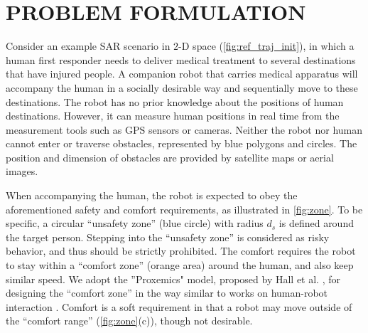 \documentclass[journal]{IEEEtran}
\begin{document}
\section{PROBLEM FORMULATION}\label{sec:formulation}
	Consider an example SAR scenario in $2$-D space (\cref{fig:ref_traj_init}), in which a human first responder needs to deliver medical treatment to several destinations that have injured people. 
	A companion robot that carries medical apparatus will accompany the human in a socially desirable way and sequentially move to these destinations.
	The robot has no prior knowledge about the positions of human destinations.
	However, it can measure human positions in real time from the measurement tools such as GPS sensors or cameras.
    Neither the robot nor human cannot enter or traverse obstacles, represented by blue polygons and circles. 
    The position and dimension of obstacles are provided by satellite maps or aerial images.
	
	When accompanying the human, the robot is expected to obey the aforementioned safety and comfort requirements, as illustrated in \cref{fig:zone}.
    To be specific, a circular ``unsafety zone'' (blue circle) with radius $d_s$ is defined around the target person.
	Stepping into the ``unsafety zone'' is considered as risky behavior, and thus should be strictly prohibited.	
	The comfort requires the robot to stay within a ``comfort zone'' (orange area) around the human, and also keep similar speed.
    We adopt the ''Proxemics" model, proposed by Hall et al. \cite{hall1968proxemics}, for designing the ``comfort zone'' in the way similar to works on human-robot interaction \cite{barnaud2014proxemics,ferrer2016robot}. %
	Comfort is a soft requirement in that a robot may move outside of the ``comfort range'' (\cref{fig:zone}(c)), though not desirable.
    
\end{document}
